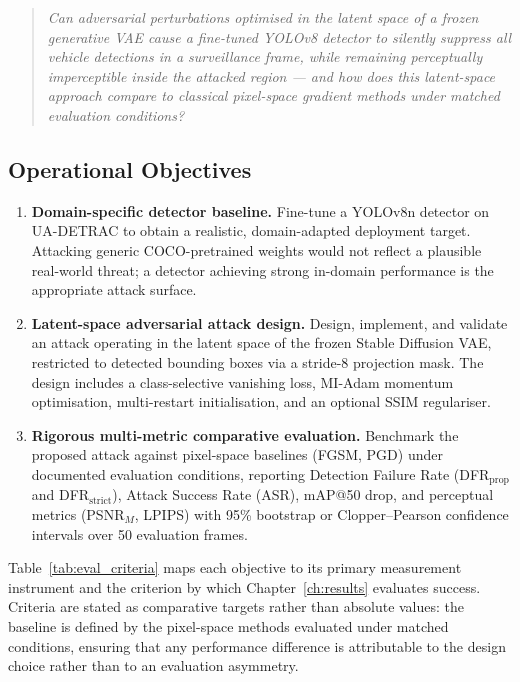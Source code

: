 \documentclass[12pt,a4paper]{report}
\begin{document}
\begin{quote}
\itshape
Can adversarial perturbations optimised in the latent space of a
frozen generative VAE cause a fine-tuned YOLOv8 detector to
silently suppress all vehicle detections in a surveillance frame,
while remaining perceptually imperceptible inside the attacked
region --- and how does this latent-space approach compare to
classical pixel-space gradient methods under matched evaluation
conditions?
\end{quote}

\subsection*{Operational Objectives}

\begin{enumerate}[label=\textbf{O\arabic*.},
                  leftmargin=*, itemsep=6pt]

  \item \textbf{Domain-specific detector baseline.}
  Fine-tune a YOLOv8n detector on UA-DETRAC to obtain a
  realistic, domain-adapted deployment target. Attacking generic
  COCO-pretrained weights would not reflect a plausible real-world
  threat; a detector achieving strong in-domain performance is
  the appropriate attack surface.

  \item \textbf{Latent-space adversarial attack design.}
  Design, implement, and validate an attack operating in the
  latent space of the frozen Stable Diffusion VAE, restricted to
  detected bounding boxes via a stride-8 projection mask. The
  design includes a class-selective vanishing loss, MI-Adam
  momentum optimisation, multi-restart initialisation, and an
  optional SSIM regulariser.

  \item \textbf{Rigorous multi-metric comparative evaluation.}
  Benchmark the proposed attack against pixel-space baselines
  (FGSM, PGD) under documented evaluation conditions, reporting
  Detection Failure Rate (DFR$_{\text{prop}}$ and
  DFR$_{\text{strict}}$), Attack Success Rate (ASR), mAP@50
  drop, and perceptual metrics (PSNR$_M$, LPIPS) with 95\%
  bootstrap or Clopper--Pearson confidence intervals over 50
  evaluation frames.

\end{enumerate}

Table~\ref{tab:eval_criteria} maps each objective to its primary
measurement instrument and the criterion by which
Chapter~\ref{ch:results} evaluates success. Criteria are stated
as comparative targets rather than absolute values: the baseline
is defined by the pixel-space methods evaluated under matched
conditions, ensuring that any performance difference is
attributable to the design choice rather than to an evaluation
asymmetry.
\end{document}
